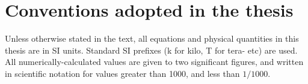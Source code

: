 \section*{Conventions adopted in the thesis}
Unless otherwise stated in the text, all equations and physical quantities in this thesis are in SI units. Standard SI prefixes (k for kilo, T for tera- etc) are used. All numerically-calculated values are given to two significant figures, and written in scientific notation for values greater than 1000, and less than $1/1000$.

%
%
